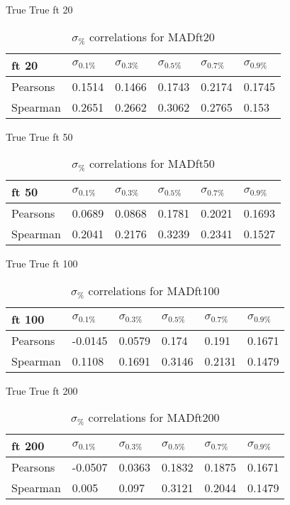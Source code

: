 \documentclass{sig-alternate}
\begin{document}
True True ft 20
\begin{table}[h!]
\centering
\caption{$\sigma_{\%}$ correlations for MADft20}
\begin{tabular}{|l|l|l|l|l|l|}
\hline
ft 20 & $\sigma_{0.1\%}$ & $\sigma_{0.3\%}$ & $\sigma_{0.5\%}$ & $\sigma_{0.7\%}$ & $\sigma_{0.9\%}$ \\ \hline
Pearsons  & 0.1514 & 0.1466 & 0.1743 & 0.2174 & 0.1745 \\ \hline
Spearman  & 0.2651 & 0.2662 & 0.3062 & 0.2765 & 0.153 \\ \hline
\end{tabular}
\end{table}
True True ft 50
\begin{table}[h!]
\centering
\caption{$\sigma_{\%}$ correlations for MADft50}
\begin{tabular}{|l|l|l|l|l|l|}
\hline
ft 50 & $\sigma_{0.1\%}$ & $\sigma_{0.3\%}$ & $\sigma_{0.5\%}$ & $\sigma_{0.7\%}$ & $\sigma_{0.9\%}$ \\ \hline
Pearsons  & 0.0689 & 0.0868 & 0.1781 & 0.2021 & 0.1693 \\ \hline
Spearman  & 0.2041 & 0.2176 & 0.3239 & 0.2341 & 0.1527 \\ \hline
\end{tabular}
\end{table}
True True ft 100
\begin{table}[h!]
\centering
\caption{$\sigma_{\%}$ correlations for MADft100}
\begin{tabular}{|l|l|l|l|l|l|}
\hline
ft 100 & $\sigma_{0.1\%}$ & $\sigma_{0.3\%}$ & $\sigma_{0.5\%}$ & $\sigma_{0.7\%}$ & $\sigma_{0.9\%}$ \\ \hline
Pearsons  & -0.0145 & 0.0579 & 0.174 & 0.191 & 0.1671 \\ \hline
Spearman  & 0.1108 & 0.1691 & 0.3146 & 0.2131 & 0.1479 \\ \hline
\end{tabular}
\end{table}
True True ft 200
\begin{table}[h!]
\centering
\caption{$\sigma_{\%}$ correlations for MADft200}
\begin{tabular}{|l|l|l|l|l|l|}
\hline
ft 200 & $\sigma_{0.1\%}$ & $\sigma_{0.3\%}$ & $\sigma_{0.5\%}$ & $\sigma_{0.7\%}$ & $\sigma_{0.9\%}$ \\ \hline
Pearsons  & -0.0507 & 0.0363 & 0.1832 & 0.1875 & 0.1671 \\ \hline
Spearman  & 0.005 & 0.097 & 0.3121 & 0.2044 & 0.1479 \\ \hline
\end{tabular}
\end{table}
\end{document}
